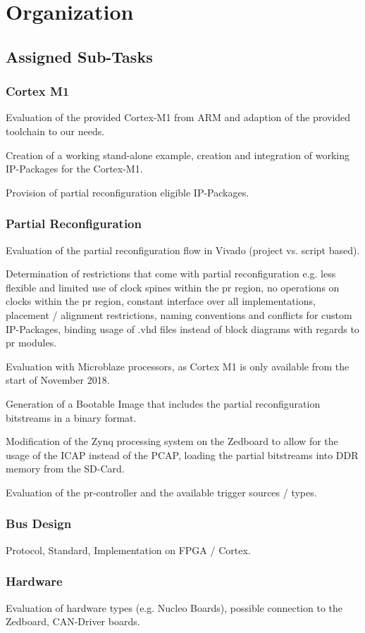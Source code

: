 \section{Organization}

\subsection{Assigned Sub-Tasks}
 \subsubsection{Cortex M1} 
 Evaluation of the provided Cortex-M1 from ARM and adaption of the provided toolchain to our needs. 

 Creation of a working stand-alone example, creation and integration of working IP-Packages for the Cortex-M1.

 Provision of partial reconfiguration eligible IP-Packages.
 \subsubsection{Partial Reconfiguration}
 Evaluation of the partial reconfiguration flow in Vivado (project vs. script based).

 Determination of restrictions that come with partial reconfiguration e.g. less flexible and limited use of clock spines within the pr region, no operations on clocks within the pr region, constant interface over all implementations, placement / alignment restrictions, naming conventions and conflicts for custom IP-Packages, binding usage of .vhd files instead of block diagrams with regards to pr modules. 

 Evaluation with Microblaze processors, as Cortex M1 is only available from the start of November 2018.

 Generation of a Bootable Image that includes the partial reconfiguration bitstreams in a binary format.

 Modification of the Zynq processing system on the Zedboard to allow for the usage of the ICAP instead of the PCAP, loading the partial bitstreams into DDR memory from the SD-Card.

 Evaluation of the pr-controller and the available trigger sources / types.
 \subsubsection{Bus Design}
 Protocol, Standard, Implementation on FPGA / Cortex.
 \subsubsection{Hardware}
 Evaluation of hardware types (e.g. Nucleo Boards), possible connection to the Zedboard, CAN-Driver boards. 
